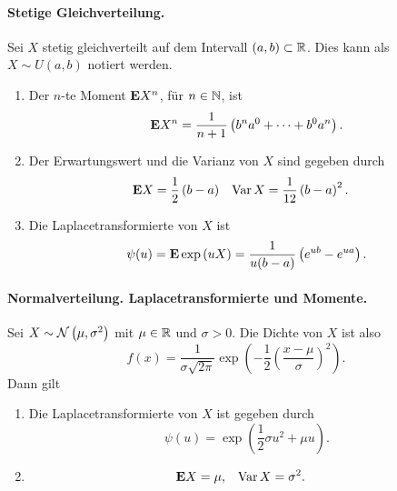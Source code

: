 \paragraph{Stetige Gleichverteilung.}
Sei $X$ stetig gleichverteilt auf dem Intervall $\left( a,b \right)\subset \mathbb R$.  
Dies kann als $X \sim U(a,b)$ notiert werden. 
\begin{enumerate}
    \item Der $n$-te Moment $\mathbf{E} X^{n}$, für $n\in\mathbb N$, ist 
        \begin{equation*}
            \mathbf{E} X^n = \frac{1}{n+1}\left( b^{n}a^0 + \cdots + b^{0}a^{n} \right).
        \end{equation*}
    \item Der Erwartungswert und die Varianz von $X$ sind gegeben durch
        \begin{align*}
            \mathbf{E} X    & = \frac{1}{2} \left( b-a \right) & 
            \operatorname{Var} X  & = \frac{1}{12} \left( b-a \right)^{2}.  
        \end{align*}
    \item Die Laplacetransformierte von $X$ ist 
        \begin{equation*}
            \psi(u) = \mathbf{E} \exp \left( u X \right) = \frac{1}{u(b-a)}\left( e^{ub} - e^{ua} \right).
        \end{equation*}
\end{enumerate}


\paragraph{Normalverteilung. Laplacetransformierte und Momente.}
Sei $X \sim \mathcal N \left( \mu, \sigma^{2} \right)$ mit $\mu\in\mathbb R$ und $\sigma>0$. 
Die Dichte von $X$ ist also
\begin{equation*}
    f(x) = \frac{1}{\sigma \sqrt{2\pi}}
    \exp \left( -\frac{1}{2} \left( \frac{x-\mu}{\sigma} \right)^2\right).
\end{equation*}
Dann gilt
\begin{enumerate}
    \item Die Laplacetransformierte von $X$ ist gegeben durch 
        \begin{equation*}
            \psi(u) = \exp \left( \frac{1}{2} \sigma u^2 + \mu u \right).
        \end{equation*}
    \item 
        \begin{align*}
            \mathbf{E} X &= \mu, & \operatorname{Var} X &= \sigma^2.
        \end{align*}
\end{enumerate}

